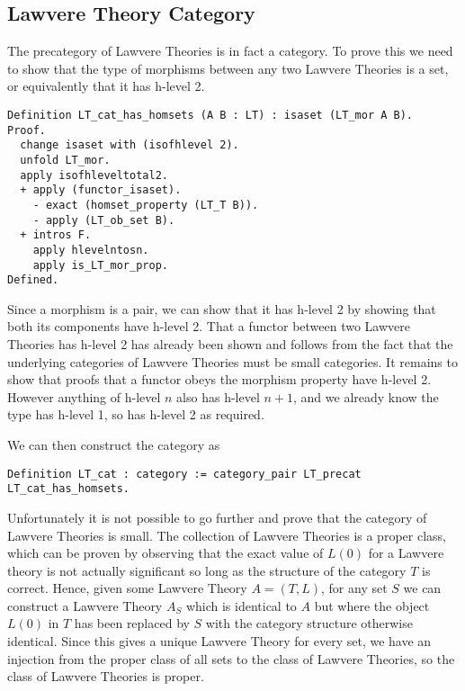\subsection{Lawvere Theory Category}
The precategory of Lawvere Theories is in fact a category. To prove this we need
to show that the type of morphisms between any two Lawvere Theories is a set, or
equivalently that it has h-level 2.
\begin{lstlisting}
Definition LT_cat_has_homsets (A B : LT) : isaset (LT_mor A B).
Proof.
  change isaset with (isofhlevel 2).
  unfold LT_mor.
  apply isofhleveltotal2.
  + apply (functor_isaset).
    - exact (homset_property (LT_T B)).
    - apply (LT_ob_set B).
  + intros F.
    apply hlevelntosn.
    apply is_LT_mor_prop.
Defined.
\end{lstlisting}
Since a morphism is a pair, we can show that it has h-level 2 by showing that
both its components have h-level 2. That a functor between two Lawvere Theories
has h-level 2 has already been shown and follows from the fact that the
underlying categories of Lawvere Theories must be small categories. It remains
to show that proofs that a functor obeys the morphism property have h-level 2.
However anything of h-level $n$ also has h-level $n+1$, and we already know the
type has h-level 1, so has h-level 2 as required.

We can then construct the category as
\begin{lstlisting}
Definition LT_cat : category := category_pair LT_precat LT_cat_has_homsets.
\end{lstlisting}

Unfortunately it is not possible to go further and prove that the category of
Lawvere Theories is small. The collection of Lawvere Theories is a proper class,
which can be proven by observing that the exact value of $L(0)$ for a Lawvere
theory is not actually significant so long as the structure of the category $T$
is correct. Hence, given some Lawvere Theory $A = (T, L)$, for any set $S$ we
can construct a Lawvere Theory $A_S$ which is identical to $A$ but where the
object $L(0)$ in $T$ has been replaced by $S$ with the category structure
otherwise identical. Since this gives a unique Lawvere Theory for every set, we
have an injection from the proper class of all sets to the class of Lawvere
Theories, so the class of Lawvere Theories is proper.